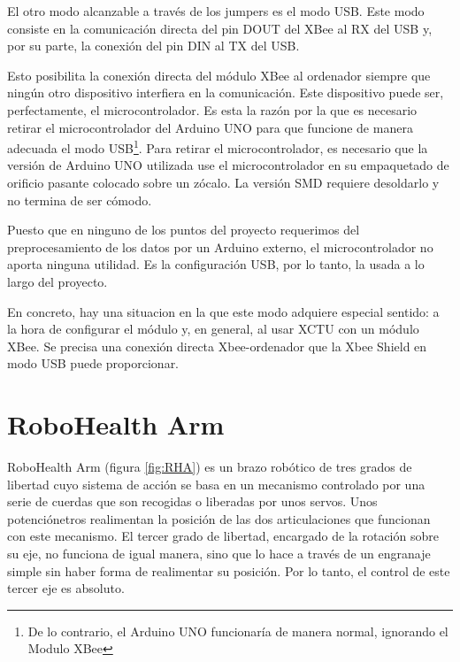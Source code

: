El otro modo alcanzable a través de los jumpers es el modo USB. Este modo consiste en la comunicación directa del pin DOUT del XBee al RX del USB y, por su parte, la conexión del pin DIN al TX del USB. 

Esto posibilita la conexión directa del módulo XBee al ordenador siempre que ningún otro dispositivo interfiera en la comunicación. Este dispositivo puede ser, perfectamente, el microcontrolador. Es esta la razón por la que es necesario retirar el microcontrolador del Arduino UNO para que funcione de manera adecuada el modo USB\footnote{De lo contrario, el Arduino UNO funcionaría de manera normal, ignorando el Modulo XBee}. Para retirar el microcontrolador, es necesario que la versión de Arduino UNO utilizada use el microcontrolador en su empaquetado de orificio pasante colocado sobre un zócalo. La versión SMD requiere desoldarlo y no termina de ser cómodo.

Puesto que en ninguno de los puntos del proyecto requerimos del preprocesamiento de los datos por un Arduino externo, el microcontrolador no aporta ninguna utilidad. Es la configuración USB, por lo tanto, la usada a lo largo del proyecto.

En concreto, hay una situacion en la que este modo adquiere especial sentido: a la hora de configurar el módulo y, en general, al usar XCTU con un módulo XBee. Se precisa una conexión directa Xbee-ordenador que la Xbee Shield en modo USB puede proporcionar.


\section{RoboHealth Arm}

RoboHealth Arm\cite{Heredia1:2018} (figura \ref{fig:RHA}) es un brazo robótico de tres grados de libertad cuyo sistema de acción se basa en un mecanismo controlado por una serie de cuerdas que son recogidas o liberadas por unos servos. Unos potenciónetros realimentan la posición de las dos articulaciones que funcionan con este mecanismo. El tercer grado de libertad, encargado de la rotación sobre su eje, no funciona de igual manera, sino que lo hace a través de un engranaje simple sin haber forma de realimentar su posición. Por lo tanto, el control de este tercer eje es absoluto.

